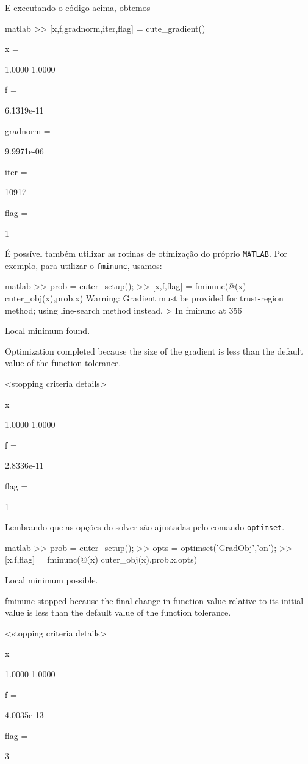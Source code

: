 E executando o c\'odigo acima, obtemos
\begin{code}{matlab}
>> [x,f,gradnorm,iter,flag] = cute_gradient()

x =

    1.0000
    1.0000


f =

   6.1319e-11


gradnorm =

   9.9971e-06


iter =

       10917


flag =

     1
\end{code}

\'E poss\'ivel tamb\'em utilizar as rotinas de otimiza\c{c}\~ao do pr\'oprio {\tt MATLAB}. Por 
exemplo, para utilizar o {\tt fminunc}, usamos:
\begin{code}{matlab}
>> prob = cuter_setup();
>> [x,f,flag] = fminunc(@(x) cuter_obj(x),prob.x)
Warning: Gradient must be provided for trust-region method;
  using line-search method instead. 
> In fminunc at 356

Local minimum found.

Optimization completed because the size of the gradient is less than
the default value of the function tolerance.

<stopping criteria details>


x =

    1.0000
    1.0000


f =

   2.8336e-11


flag =

     1
\end{code}
Lembrando que as op\c{c}\~oes do solver s\~ao ajustadas pelo comando {\tt optimset}.
\begin{code}{matlab}
>> prob = cuter_setup();
>> opts = optimset('GradObj','on');
>> [x,f,flag] = fminunc(@(x) cuter_obj(x),prob.x,opts)

Local minimum possible.

fminunc stopped because the final change in function value relative to 
its initial value is less than the default value of the function tolerance.

<stopping criteria details>


x =

    1.0000
    1.0000


f =

   4.0035e-13


flag =

     3
\end{code}
